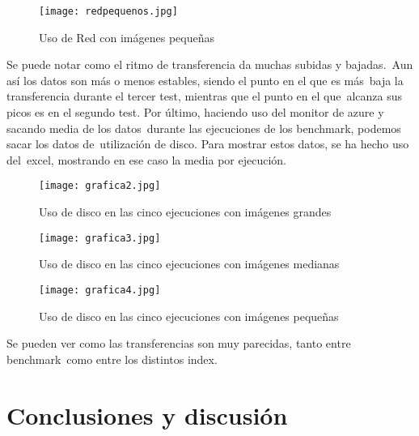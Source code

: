 \documentclass[11pt,twoside,a4paper]{book}
\begin{document}
\begin{figure}[H]
   \texttt{[image: redpequenos.jpg]}
   \caption{Uso de Red con imágenes pequeñas}
   \label{red3}
\end{figure}
Se puede notar como el ritmo de transferencia da muchas subidas y bajadas.\
Aun así los datos son más o menos estables, siendo el punto en el que es más\
baja la transferencia durante el tercer test, mientras que el punto en el que\
alcanza sus picos es en el segundo test. \newline
Por último, haciendo uso del monitor de azure y sacando media de los datos\
durante las ejecuciones de los benchmark, podemos sacar los datos de\
utilización de disco. Para mostrar estos datos, se ha hecho uso del\
excel, mostrando en ese caso la media por ejecución.

\begin{figure}[H]
   \texttt{[image: grafica2.jpg]}
   \caption{Uso de disco en las cinco ejecuciones con imágenes grandes}
   \label{Fig2}
\end{figure}

\begin{figure}[H]
   \texttt{[image: grafica3.jpg]}
\caption{Uso de disco en las cinco ejecuciones con imágenes medianas}   \label{Fig3}
\end{figure}

\begin{figure}[H]
   \texttt{[image: grafica4.jpg]}
   \caption{Uso de disco en las cinco ejecuciones con imágenes pequeñas}
   \label{Fig4}
\end{figure}
Se pueden ver como las transferencias son muy parecidas, tanto entre benchmark\
como entre los distintos index.

\chapter{Conclusiones y discusión}
\end{document}
